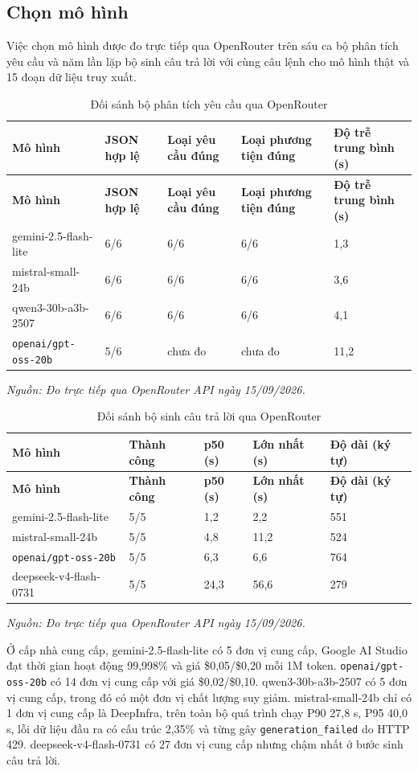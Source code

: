 \documentclass[12pt,a4paper,oneside]{report}
\newcommand{\tabsource}[1]{%
  \par\vspace{1pt}%
  {\raggedright\fontsize{10pt}{12pt}\selectfont\itshape Nguồn: #1\par}%
}
\begin{document}
\subsection{Chọn mô hình}
Việc chọn mô hình được đo trực tiếp qua OpenRouter trên sáu ca bộ phân tích yêu cầu và năm lần lặp bộ sinh câu trả lời với cùng câu lệnh cho mô hình thật và 15 đoạn dữ liệu truy xuất.
\begin{longtable}{|L{4.0cm}|R{2.4cm}|R{2.5cm}|R{2.6cm}|R{2.5cm}|}
  \caption{Đối sánh bộ phân tích yêu cầu qua OpenRouter}\label{tab:analyzer-benchmark} \\
  \hline
  \textbf{Mô hình} & \textbf{JSON hợp lệ} & \textbf{Loại yêu cầu đúng} & \textbf{Loại phương tiện đúng} & \textbf{Độ trễ trung bình (s)} \\
  \hline
  \endfirsthead
  \hline
  \textbf{Mô hình} & \textbf{JSON hợp lệ} & \textbf{Loại yêu cầu đúng} & \textbf{Loại phương tiện đúng} & \textbf{Độ trễ trung bình (s)} \\
  \hline
  \endhead
  gemini-2.5-flash-lite       & 6/6 & 6/6    & 6/6    & 1,3  \\
  \hline
  mistral-small-24b           & 6/6 & 6/6    & 6/6    & 3,6  \\
  \hline
  qwen3-30b-a3b-2507          & 6/6 & 6/6    & 6/6    & 4,1  \\
  \hline
  \texttt{openai/gpt-oss-20b} & 5/6 & chưa đo & chưa đo & 11,2 \\
  \hline
\end{longtable}
\tabsource{Đo trực tiếp qua OpenRouter API ngày 15/09/2026.}
\begin{longtable}{|L{4.0cm}|R{2.2cm}|R{2.1cm}|R{2.4cm}|R{3.2cm}|}
  \caption{Đối sánh bộ sinh câu trả lời qua OpenRouter}\label{tab:generator-benchmark} \\
  \hline
  \textbf{Mô hình} & \textbf{Thành công} & \textbf{p50 (s)} & \textbf{Lớn nhất (s)} & \textbf{Độ dài (ký tự)} \\
  \hline
  \endfirsthead
  \hline
  \textbf{Mô hình} & \textbf{Thành công} & \textbf{p50 (s)} & \textbf{Lớn nhất (s)} & \textbf{Độ dài (ký tự)} \\
  \hline
  \endhead
  gemini-2.5-flash-lite       & 5/5 & 1,2  & 2,2  & 551 \\
  \hline
  mistral-small-24b           & 5/5 & 4,8  & 11,2 & 524 \\
  \hline
  \texttt{openai/gpt-oss-20b} & 5/5 & 6,3  & 6,6  & 764 \\
  \hline
  deepseek-v4-flash-0731      & 5/5 & 24,3 & 56,6 & 279 \\
  \hline
\end{longtable}
\tabsource{Đo trực tiếp qua OpenRouter API ngày 15/09/2026.}
Ở cấp nhà cung cấp, gemini-2.5-flash-lite có 5 đơn vị cung cấp, Google AI Studio đạt thời gian hoạt động 99,998\% và giá \$0,05/\$0,20 mỗi 1M token. \texttt{openai/gpt-oss-20b} có 14 đơn vị cung cấp với giá \$0,02/\$0,10. qwen3-30b-a3b-2507 có 5 đơn vị cung cấp, trong đó có một đơn vị chất lượng suy giảm. mistral-small-24b chỉ có 1 đơn vị cung cấp là DeepInfra, trên toàn bộ quá trình chạy P90 27,8 s, P95 40,0 s, lỗi dữ liệu đầu ra có cấu trúc 2,35\% và từng gây \texttt{generation\_failed} do HTTP 429. deepseek-v4-flash-0731 có 27 đơn vị cung cấp nhưng chậm nhất ở bước sinh câu trả lời.
\end{document}
